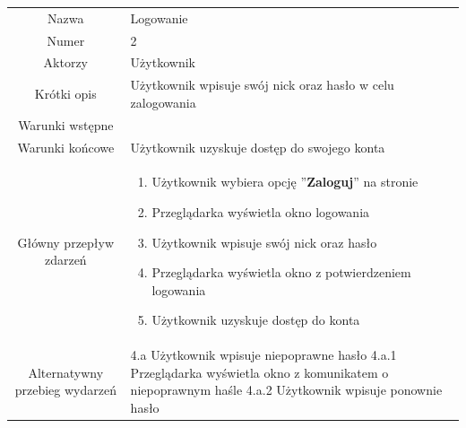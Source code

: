 \documentclass[a4paper]{article}
\begin{document}
\begin{tabular}{c p{10cm}}
Nazwa&	Logowanie\\
Numer	& 2\\
Aktorzy &	Użytkownik\\
Krótki opis &  Użytkownik wpisuje swój nick oraz hasło w celu zalogowania\\
Warunki wstępne&	\\
Warunki końcowe&	Użytkownik uzyskuje dostęp do swojego konta\\
Główny przepływ zdarzeń&
\begin{enumerate}
\item Użytkownik wybiera opcję ''\textbf{Zaloguj}'' na stronie 
\item Przeglądarka wyświetla okno logowania
\item Użytkownik wpisuje swój nick oraz hasło
\item Przeglądarka wyświetla okno z potwierdzeniem logowania
\item Użytkownik uzyskuje dostęp do konta

\end{enumerate} \\
Alternatywny przebieg wydarzeń & 
4.a Użytkownik wpisuje niepoprawne hasło \newline
4.a.1 Przeglądarka wyświetla okno z komunikatem o niepoprawnym haśle \newline
4.a.2 Użytkownik wpisuje ponownie hasło\newline
\\
\hline
\end{tabular}
\newline
\newline
\end{document}
